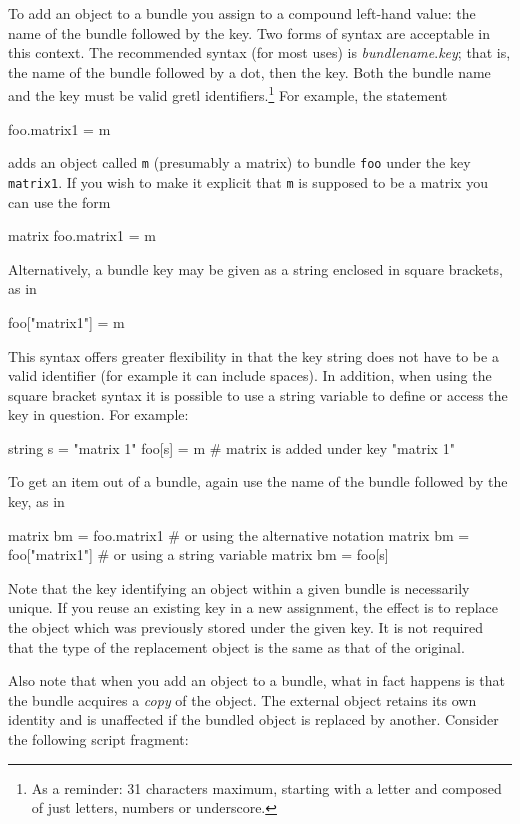 To add an object to a bundle you assign to a compound left-hand value:
the name of the bundle followed by the key. Two forms of syntax are
acceptable in this context. The recommended syntax (for most uses) is
\textsl{bundlename}.\textsl{key}; that is, the name of the bundle
followed by a dot, then the key. Both the bundle name and the key must
be valid gretl identifiers.\footnote{As a reminder: 31 characters
  maximum, starting with a letter and composed of just letters,
  numbers or underscore.} For example, the statement
%
\begin{code}
foo.matrix1 = m
\end{code}
%
adds an object called \texttt{m} (presumably a matrix) to bundle
\texttt{foo} under the key \texttt{matrix1}. If you wish to make it
explicit that \texttt{m} is supposed to be a matrix you can use the
form
%
\begin{code}
matrix foo.matrix1 = m
\end{code}

Alternatively, a bundle key may be given as a string enclosed in
square brackets, as in
%
\begin{code}
foo["matrix1"] = m
\end{code}
%
This syntax offers greater flexibility in that the key string does not
have to be a valid identifier (for example it can include spaces). In
addition, when using the square bracket syntax it is possible to use a
string variable to define or access the key in question. For example:
%
\begin{code}
string s = "matrix 1"
foo[s] = m # matrix is added under key "matrix 1"
\end{code}

To get an item out of a bundle, again use the name of the bundle
followed by the key, as in

\begin{code}
matrix bm = foo.matrix1
# or using the alternative notation
matrix bm = foo["matrix1"]
# or using a string variable
matrix bm = foo[s]
\end{code}

Note that the key identifying an object within a given bundle is
necessarily unique. If you reuse an existing key in a new assignment,
the effect is to replace the object which was previously stored under
the given key. It is not required that the type of the replacement
object is the same as that of the original.

Also note that when you add an object to a bundle, what in fact
happens is that the bundle acquires a \textit{copy} of the object. The
external object retains its own identity and is unaffected if the
bundled object is replaced by another. Consider the following script
fragment:

